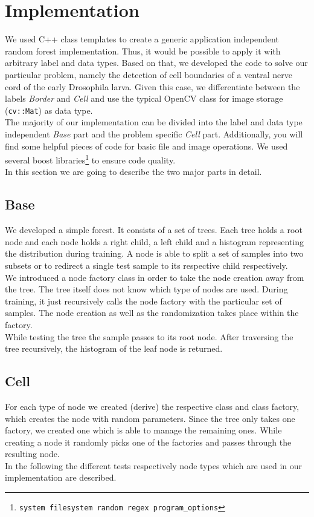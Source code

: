 \section{Implementation}
\label{sec:implementation}


We used C++ class templates to create a generic application independent random forest implementation. Thus, it would be possible to apply it with arbitrary label and data types. Based on that, we developed the code to solve our particular problem, namely the detection of cell boundaries of a ventral nerve cord of the early Drosophila larva. Given this case, we differentiate between the labels \emph{Border} and \emph{Cell} and use the typical OpenCV class for image storage (\texttt{cv::Mat}) as data type.\\
The majority of our implementation can be divided into the label and data type independent \emph{Base} part and the problem specific \emph{Cell} part. Additionally, you will find some helpful pieces of code for basic file and image operations. We used several boost libraries\footnote{\texttt{system filesystem random regex program\_options}} to ensure code quality.\\
In this section we are going to describe the two major parts in detail.

\subsection{Base}
\label{subsec:base}
We developed a simple forest. It consists of a set of trees. Each tree holds a root node and each node holds a right child, a left child and a histogram representing the distribution during training. A node is able to split a set of samples into two subsets or to redirect a single test sample to its respective child respectively. \\
We introduced a node factory class in order to take the node creation away from the tree. The tree itself does not know which type of nodes are used. During training, it just recursively calls the node factory with the particular set of samples. The node creation as well as the randomization takes place within the factory. \\
While testing the tree the sample passes to its root node. After traversing the tree recursively, the histogram of the leaf node is returned. 

\subsection{Cell}
\label{subsec:base}
For each type of node we created (derive) the respective class and class factory, which creates the node with random parameters. Since the tree only takes one factory, we created one which is able to manage the remaining ones. While creating a node it randomly picks one of the factories and passes through the resulting node.\\
In the following the different tests respectively node types which are used in our implementation are described.


